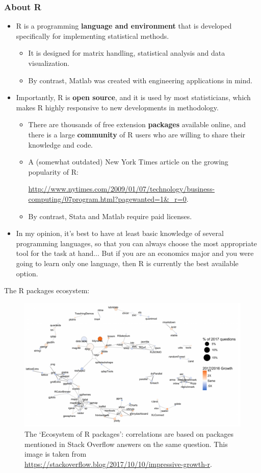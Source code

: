 \documentclass{beamer}
\begin{document}
\begin{frame}[allowframebreaks]
 \frametitle{About R}

	\begin{itemize}
		\item
		R is a programming \textbf{language and environment} that is developed specifically for implementing statistical methods.
		\begin{itemize}
			\item
			It is designed for matrix handling, statistical analysis and data visualization.
			\item
			By contrast, Matlab was created with engineering applications in mind.
		\end{itemize}
		\item
		Importantly, R is \textbf{open source}, and it is used by most statisticians, which makes R highly responsive to new developments in methodology.
		\begin{itemize}
			\item
			There are thousands of free extension \textbf{packages} available online, and there is a large \textbf{community} of R users who are willing to share their knowledge and code.
			\item
			A (somewhat outdated) New York Times article on the growing popularity of R:
			
			\scriptsize \url{http://www.nytimes.com/2009/01/07/technology/business-computing/07program.html?pagewanted=1&_r=0}\small .
			\item
			By contrast, Stata and Matlab require paid licenses.
		\end{itemize}
		\item
		In my opinion, it's best to have at least basic knowledge of several programming languages, so that you can always choose the most appropriate tool for the task at hand... But if you are an economics major and you were going to learn only one language, then R is currently the best available option.
	\end{itemize}
	
	The R packages ecosystem:
		\begin{figure}
		\centering
		\includegraphics[width=.8\textwidth]{figures/rpackages_eco}
		\caption{\scriptsize The `Ecosystem of R packages': correlations are based on packages mentioned in Stack Overflow answers on the same question. This image is taken from \tiny\url{https://stackoverflow.blog/2017/10/10/impressive-growth-r}\scriptsize.}
		\label{Fig: 1}
		\end{figure}
	

\end{frame}
\end{document}
